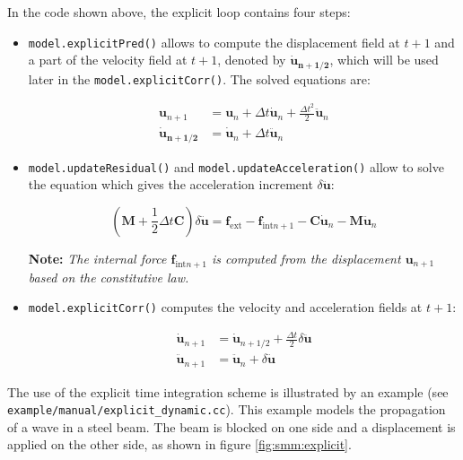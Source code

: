 \documentclass[a4paper,11pt]{book}
\newcommand{\code}[1]{\texttt{#1}}
\newcommand{\note}[1]{\textbf{Note: }\textit{#1}}
\renewcommand{\vec}[1]{\ensuremath{\boldsymbol{#1}}}
\newcommand{\mat}[1]{\ensuremath{\boldsymbol{#1}}}
\newcommand{\st}[1]{{\mathrm{#1}}}
\begin{document}
In the code shown above, the explicit loop contains four steps:
\begin{itemize}
\item \code{model.explicitPred()}  allows to  compute the displacement  field at
  $t+1$   and   a  part   of   the  velocity   field   at   $t+1$,  denoted   by
  $\vec{\dot{u}_{n+1/2}}$,    which    will     be    used    later    in    the
  \code{model.explicitCorr()}. The solved equations are:

  \begin{align}
    \vec{u}_{n+1}  &= \vec{u}_{n}  + \Delta  t \vec{\dot{u}}_{n}  + \frac{\Delta
      t^2}{2} \vec{\ddot{u}}_{n}\\
    \vec{\dot{u}_{n+1/2}}  &= \vec{\dot{u}}_{n} +  \Delta t  \vec{\ddot{u}}_{n}
    \label{eqn:smm:explicit:onehalfvelocity}
  \end{align}

\item \code{model.updateResidual()}  and \code{model.updateAcceleration()} allow
  to  solve  the  equation   which  gives  the  acceleration  increment  $\delta
  \vec{\ddot{u}}$:

  \begin{equation}
    \left(\mat{M}  +  \frac{1}{2}  \Delta  t \mat{C}\right)  \delta  \vec{\ddot{u}}  =
      \vec{f_{\st{ext}}} -  \vec{f}_{\st{int}n+1} - \mat{C}  \vec{\dot{u}}_{n} -
      \mat{M} \vec{\ddot{u}}_{n}
  \end{equation}

  \note{The  internal   force  $\vec{f}_{\st{int}n+1}$  is   computed  from  the
    displacement $\vec{u}_{n+1}$ based on the constitutive law.}

\item \code{model.explicitCorr()} computes  the velocity and acceleration fields
  at $t+1$:

  \begin{align}
    \vec{\dot{u}}_{n+1}  &= \vec{\dot{u}}_{n+1/2} + \frac{\Delta t}{2} \delta \vec{\ddot{u}} \\
    \vec{\ddot{u}}_{n+1}  &= \vec{\ddot{u}}_{n} +  \delta \vec{\ddot{u}}
  \end{align}
\end{itemize}

The use  of the explicit  time integration scheme  is illustrated by  an example
(see  \code{example/manual/explicit\_dynamic.cc}).    This  example  models  the
propagation of  a wave in a  steel beam. The beam  is blocked on one  side and a
displacement   is   applied   on   the   other  side,   as   shown   in   figure
\ref{fig:smm:explicit}.
\end{document}
